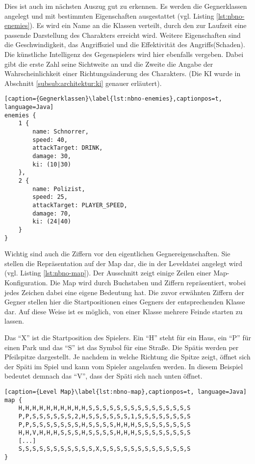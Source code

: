 Dies ist auch im nächsten Auszug gut zu erkennen.
Es werden die Gegnerklassen angelegt und mit bestimmten Eigenschaften ausgestattet (vgl. Listing \ref{lst:nbno-enemies}).
Es wird ein Name an die Klassen verteilt, durch den zur Laufzeit eine passende Darstellung des Charakters erreicht wird.
Weitere Eigenschaften sind die Geschwindigkeit, das Angriffsziel und die Effektivität des Angriffs(Schaden).
Die künstliche Intelligenz des Gegenspielers wird hier ebenfalls vergeben.
Dabei gibt die erste Zahl seine Sichtweite an und die Zweite die Angabe der Wahrscheinlichkeit einer Richtungsänderung des Charakters. (Die KI wurde in Abschnitt \ref{subsub:architektur:ki} genauer erläutert).

\begin{lstlisting}[caption={Gegnerklassen}\label{lst:nbno-enemies},captionpos=t, language=Java]
enemies {
    1 {
        name: Schnorrer,
        speed: 40,
        attackTarget: DRINK,
        damage: 30,
        ki: (10|30)
    },
    2 {
        name: Polizist,
        speed: 25,
        attackTarget: PLAYER_SPEED,
        damage: 70,
        ki: (24|40)
    }
}
\end{lstlisting}

Wichtig sind auch die Ziffern vor den eigentlichen Gegnereigenschaften. Sie stellen die Repräsentation auf der Map dar, die in der Leveldatei angelegt wird (vgl. Listing \ref{lst:nbno-map}). Der Ausschnitt zeigt einige Zeilen einer Map-Konfiguration. Die Map wird durch Buchstaben und Ziffern repräsentiert, wobei jedes Zeichen dabei eine eigene Bedeutung hat. Die zuvor erwähnten Ziffern der Gegner stellen hier die Startpositionen eines Gegners der entsprechenden Klasse dar. Auf diese Weise ist es möglich, von einer Klasse mehrere Feinde starten zu lassen.

Das ``X'' ist die Startposition des Spielers. Ein ``H'' steht für ein Haus, ein ``P'' für einen Park und das ``S'' ist das Symbol für eine Straße. Die Spätis werden per Pfeilspitze dargestellt. Je nachdem in welche Richtung die Spitze zeigt, öffnet sich der Späti im Spiel und kann vom Spieler angelaufen werden. In diesem Beispiel bedeutet demnach das ``V'', dass der Späti sich nach unten öffnet.

\begin{lstlisting}[caption={Level Map}\label{lst:nbno-map},captionpos=t, language=Java] 
map {
    H,H,H,H,H,H,H,H,H,H,S,S,S,S,S,S,S,S,S,S,S,S,S,S,S
    P,P,S,S,S,S,S,S,2,H,S,S,S,S,S,S,1,S,S,S,S,S,S,S,S
    P,P,S,S,S,S,S,S,S,H,S,S,S,S,H,H,H,S,S,S,S,S,S,S,S
    H,H,V,H,H,H,S,S,S,H,S,S,S,S,H,H,H,S,S,S,S,S,S,S,S
	[...]
    S,S,S,S,S,S,S,S,S,S,S,X,S,S,S,S,S,S,S,S,S,S,S,S,S
}
\end{lstlisting}

